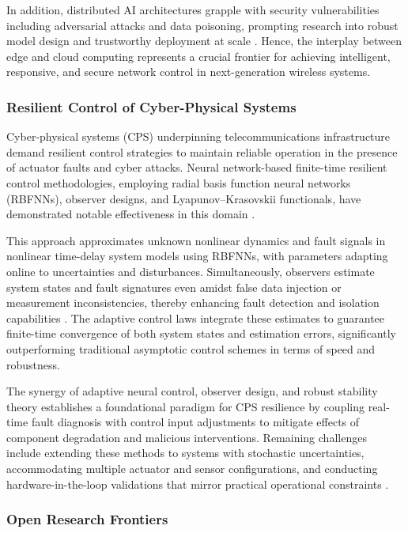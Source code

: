 In addition, distributed AI architectures grapple with security vulnerabilities including adversarial attacks and data poisoning, prompting research into robust model design and trustworthy deployment at scale \cite{ref49,ref50}. Hence, the interplay between edge and cloud computing represents a crucial frontier for achieving intelligent, responsive, and secure network control in next-generation wireless systems.

\subsubsection{Resilient Control of Cyber-Physical Systems}

Cyber-physical systems (CPS) underpinning telecommunications infrastructure demand resilient control strategies to maintain reliable operation in the presence of actuator faults and cyber attacks. Neural network-based finite-time resilient control methodologies, employing radial basis function neural networks (RBFNNs), observer designs, and Lyapunov--Krasovskii functionals, have demonstrated notable effectiveness in this domain \cite{ref46}.

This approach approximates unknown nonlinear dynamics and fault signals in nonlinear time-delay system models using RBFNNs, with parameters adapting online to uncertainties and disturbances. Simultaneously, observers estimate system states and fault signatures even amidst false data injection or measurement inconsistencies, thereby enhancing fault detection and isolation capabilities \cite{ref46}. The adaptive control laws integrate these estimates to guarantee finite-time convergence of both system states and estimation errors, significantly outperforming traditional asymptotic control schemes in terms of speed and robustness.

The synergy of adaptive neural control, observer design, and robust stability theory establishes a foundational paradigm for CPS resilience by coupling real-time fault diagnosis with control input adjustments to mitigate effects of component degradation and malicious interventions. Remaining challenges include extending these methods to systems with stochastic uncertainties, accommodating multiple actuator and sensor configurations, and conducting hardware-in-the-loop validations that mirror practical operational constraints \cite{ref46}.

\subsubsection{Open Research Frontiers}

